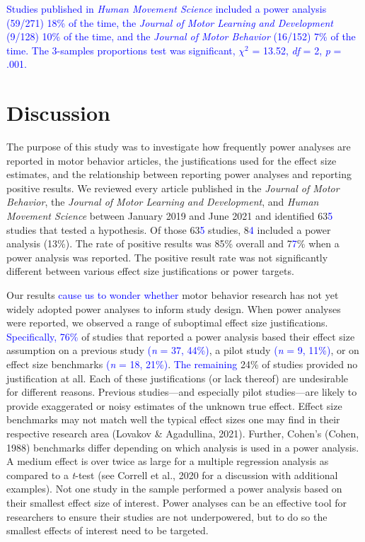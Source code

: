 \documentclass[
  man, donotrepeattitle,mask,floatsintext]{apa7}
\begin{document}
\textcolor{blue}{Studies published in \emph{Human Movement Science} included a power analysis (59/271) 18\% of the time, the \emph{Journal of Motor Learning and Development} (9/128) 10\% of the time, and the \emph{Journal of Motor Behavior} (16/152) 7\% of the time. The 3-samples proportions test was significant, $\chi^2$ = 13.52, \emph{df} = 2, \emph{p} = .001.}

\hypertarget{discussion}{%
\section{Discussion}\label{discussion}}

The purpose of this study was to investigate how frequently power analyses are reported in motor behavior articles, the justifications used for the effect size estimates, and the relationship between reporting power analyses and reporting positive results. We reviewed every article published in the \emph{Journal of Motor Behavior}, the \emph{Journal of Motor Learning and Development}, and \emph{Human Movement Science} between January 2019 and June 2021 and identified 63\textcolor{blue}{5} studies that tested a hypothesis. Of those 63\textcolor{blue}{5} studies, 8\textcolor{blue}{4} included a power analysis (13\%). The rate of positive results was 85\% overall and 7\textcolor{blue}{7}\% when a power analysis was reported. The positive result rate was not significantly different between various effect size justifications or power targets.

Our results \textcolor{blue}{cause us to wonder whether} motor behavior research has not yet widely adopted power analyses to inform study design. When power analyses were reported, we observed a range of suboptimal effect size justifications. \textcolor{blue}{Specifically, 76\%} of studies that reported a power analysis based their effect size assumption on a previous study \textcolor{blue}{(\emph{n} = 37, 44\%)}, a pilot study \textcolor{blue}{(\emph{n} = 9, 11\%)}, or on effect size benchmarks \textcolor{blue}{(\emph{n} = 18, 21\%)}. \textcolor{blue}{The remaining} 24\% of studies provided no justification at all. Each of these justifications (or lack thereof) are undesirable for different reasons. Previous studies---and especially pilot studies---are likely to provide exaggerated or noisy estimates of the unknown true effect. Effect size benchmarks may not match well the typical effect sizes one may find in their respective research area (Lovakov \& Agadullina, 2021). Further, Cohen's (Cohen, 1988) benchmarks differ depending on which analysis is used in a power analysis. A medium effect is over twice as large for a multiple regression analysis as compared to a \emph{t}-test (see Correll et al., 2020 for a discussion with additional examples). Not one study in the sample performed a power analysis based on their smallest effect size of interest. Power analyses can be an effective tool for researchers to ensure their studies are not underpowered, but to do so the smallest effects of interest need to be targeted.
\end{document}
